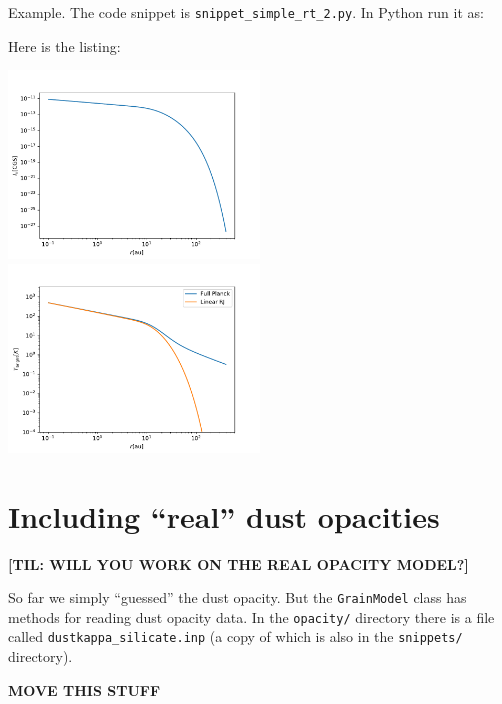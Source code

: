\documentclass{book}
\newcommand{\code}[1]{{\small\tt #1}}
\begin{document}
Example. The code snippet is
\code{snippet\_simple\_rt\_2.py}. In Python run it as:
\begin{codebox}
\end{codebox}
Here is the listing:

\centerline{\includegraphics[width=0.5\textwidth]{../snippets/fig_snippet_simple_rt_2_1.pdf}
\includegraphics[width=0.5\textwidth]{../snippets/fig_snippet_simple_rt_2_2.pdf}}

\section{Including ``real'' dust opacities}\label{sec-incl-real-dust-opac}



{\bf [TIL: WILL YOU WORK ON THE REAL OPACITY MODEL?]}



So far we simply ``guessed'' the dust opacity. But the \code{GrainModel}
class has methods for
reading dust opacity data. In the \code{opacity/} directory there is
a file called \code{dustkappa\_silicate.inp} (a copy of which is also
in the \code{snippets/} directory).





{\bf MOVE THIS STUFF}
\end{document}
